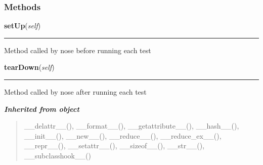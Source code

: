   \subsubsection{Methods}

    \label{saip:tests:TestController:setUp}

    \vspace{0.5ex}

\hspace{.8\funcindent}\begin{boxedminipage}{\funcwidth}

    \raggedright \textbf{setUp}(\textit{self})

    \vspace{-1.5ex}

    \rule{\textwidth}{0.5\fboxrule}
\setlength{\parskip}{2ex}
    Method called by nose before running each test

\setlength{\parskip}{1ex}
    \end{boxedminipage}

    \label{saip:tests:TestController:tearDown}

    \vspace{0.5ex}

\hspace{.8\funcindent}\begin{boxedminipage}{\funcwidth}

    \raggedright \textbf{tearDown}(\textit{self})

    \vspace{-1.5ex}

    \rule{\textwidth}{0.5\fboxrule}
\setlength{\parskip}{2ex}
    Method called by nose after running each test

\setlength{\parskip}{1ex}
    \end{boxedminipage}


\large{\textbf{\textit{Inherited from object}}}

\begin{quote}
\_\_delattr\_\_(), \_\_format\_\_(), \_\_getattribute\_\_(), \_\_hash\_\_(), \_\_init\_\_(), \_\_new\_\_(), \_\_reduce\_\_(), \_\_reduce\_ex\_\_(), \_\_repr\_\_(), \_\_setattr\_\_(), \_\_sizeof\_\_(), \_\_str\_\_(), \_\_subclasshook\_\_()
\end{quote}

